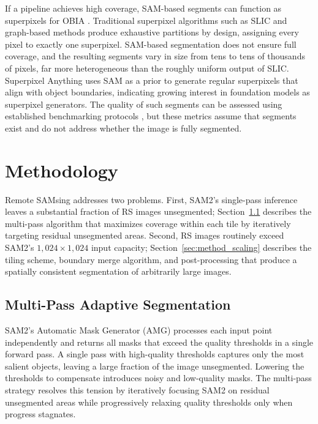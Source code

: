 \documentclass[review,11pt,authoryear]{elsarticle}
\begin{document}
If a pipeline achieves high coverage, SAM-based segments can function as superpixels for OBIA \citep{blaschke2010obia, benz2004ecognition, baatz2000multiresolution}. Traditional superpixel algorithms \citep{ren2003superpixel} such as SLIC \citep{achanta2012slic} and graph-based methods \citep{felzenszwalb2004efficient} produce exhaustive partitions by design, assigning every pixel to exactly one superpixel. SAM-based segmentation does not ensure full coverage, and the resulting segments vary in size from tens to tens of thousands of pixels, far more heterogeneous than the roughly uniform output of SLIC. Superpixel Anything \citep{walther2025superpixelanything} uses SAM as a prior to generate regular superpixels that align with object boundaries, indicating growing interest in foundation models as superpixel generators. The quality of such segments can be assessed using established benchmarking protocols \citep{stutz2018superpixels}, but these metrics assume that segments exist and do not address whether the image is fully segmented.


\section{Methodology}
\label{sec:methodology}

Remote SAMsing addresses two problems. First, SAM2's single-pass inference leaves a substantial fraction of RS images unsegmented; Section~\ref{sec:method_multipass} describes the multi-pass algorithm that maximizes coverage within each tile by iteratively targeting residual unsegmented areas. Second, RS images routinely exceed SAM2's $1{,}024 \times 1{,}024$ input capacity; Section~\ref{sec:method_scaling} describes the tiling scheme, boundary merge algorithm, and post-processing that produce a spatially consistent segmentation of arbitrarily large images.

\subsection{Multi-Pass Adaptive Segmentation}
\label{sec:method_multipass}

SAM2's Automatic Mask Generator (AMG) processes each input point independently and returns all masks that exceed the quality thresholds in a single forward pass. A single pass with high-quality thresholds captures only the most salient objects, leaving a large fraction of the image unsegmented. Lowering the thresholds to compensate introduces noisy and low-quality masks. The multi-pass strategy resolves this tension by iteratively focusing SAM2 on residual unsegmented areas while progressively relaxing quality thresholds only when progress stagnates.
\end{document}
